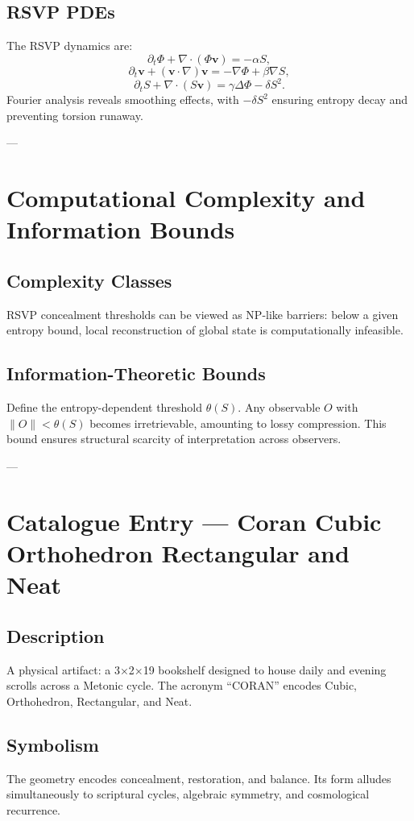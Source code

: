 \section*{RSVP PDEs}
The RSVP dynamics are:
\[
\partial_t \Phi + \nabla \cdot (\Phi \mathbf{v}) = -\alpha S,
\]
\[
\partial_t \mathbf{v} + (\mathbf{v}\cdot\nabla)\mathbf{v} = -\nabla \Phi + \beta \nabla S,
\]
\[
\partial_t S + \nabla\cdot(S\mathbf{v}) = \gamma \Delta \Phi - \delta S^2.
\]
Fourier analysis reveals smoothing effects, with $-\delta S^2$ ensuring entropy decay and preventing torsion runaway.  

---

\chapter{Computational Complexity and Information Bounds}
\section*{Complexity Classes}
RSVP concealment thresholds can be viewed as NP-like barriers: below a given entropy bound, local reconstruction of global state is computationally infeasible.  

\section*{Information-Theoretic Bounds}
Define the entropy-dependent threshold $\theta(S)$.  
Any observable $O$ with $\|O\| < \theta(S)$ becomes irretrievable, amounting to lossy compression.  
This bound ensures structural scarcity of interpretation across observers.  

---

\chapter{Catalogue Entry — Coran Cubic Orthohedron Rectangular and Neat}
\section*{Description}
A physical artifact: a 3×2×19 bookshelf designed to house daily and evening scrolls across a Metonic cycle.  
The acronym “CORAN” encodes Cubic, Orthohedron, Rectangular, and Neat.  

\section*{Symbolism}
The geometry encodes concealment, restoration, and balance.  
Its form alludes simultaneously to scriptural cycles, algebraic symmetry, and cosmological recurrence.  

